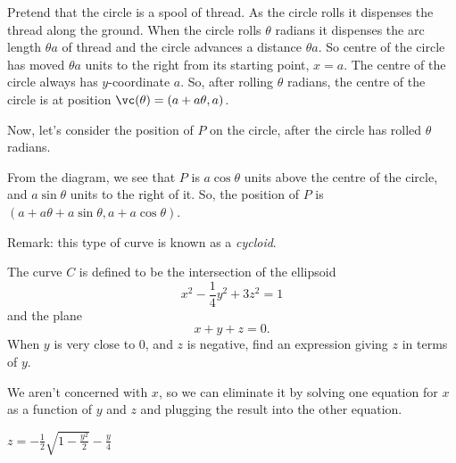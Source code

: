 \begin{solution}
Pretend that the circle is a spool of thread. As the 
           circle rolls it dispenses the thread along the ground.
           When the circle rolls $\theta$ radians it dispenses the
           arc length $\theta a$ of thread and the circle advances
           a distance $\theta a$. So centre of the circle has 
           moved $\theta a$ units to the right from its starting point, $x=a$. The centre of the circle always has $y$-coordinate $a$. So, after rolling $\theta$ radians, the centre of the circle is at position $\vc(\theta)=(a+a\theta,a)$.

Now, let's consider the position of $P$ on the circle, after the circle has rolled $\theta$ radians. 

\begin{center}
\end{center}
From the diagram, we see that $P$ is $a\cos \theta$ units above the centre of the circle, and $a\sin \theta$ units to the right of it. So, the position of $P$ is $(a+a\theta+a\sin\theta,a+a\cos\theta)$.

Remark: this type of curve is known as a \emph{cycloid}.
\end{solution}
\begin{question}\label{prob_s1.0last}
The curve $C$ is defined to be the intersection of the ellipsoid
\[x^2-\frac{1}{4}y^2+3z^2=1\]
and the plane
\[x+y+z=0.\]
When $y$ is very close to 0, and $z$ is negative, find an expression giving $z$ in terms of $y$.
\end{question}
\begin{hint}
We aren't concerned with $x$, so we can eliminate it by solving one equation for $x$ as a function
        of $y$ and $z$ and plugging the result into the other equation.
        \end{hint}
\begin{answer}
$z=-\frac12\sqrt{1-\frac{y^2}{2}}-\frac{y}{4}$
\end{answer}
